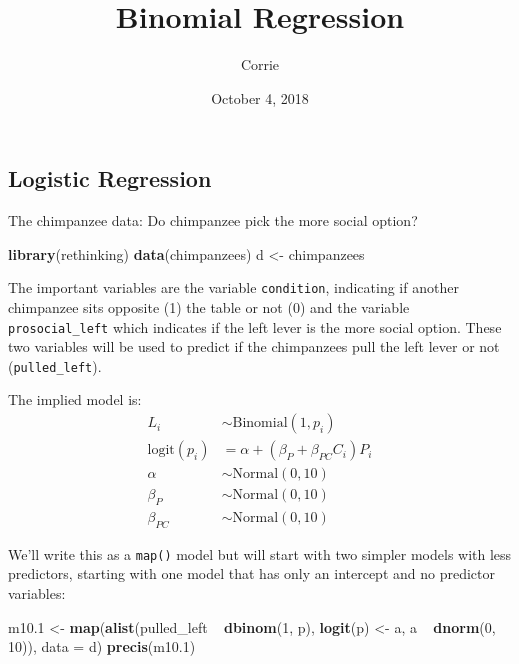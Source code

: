 \documentclass[]{tufte-handout}
\title{Binomial Regression}
\author{Corrie}
\date{October 4, 2018}
\newenvironment{Shaded}{}{}
\newcommand{\KeywordTok}[1]{\textcolor[rgb]{0.00,0.44,0.13}{\textbf{#1}}}
\newcommand{\DataTypeTok}[1]{\textcolor[rgb]{0.56,0.13,0.00}{#1}}
\newcommand{\DecValTok}[1]{\textcolor[rgb]{0.25,0.63,0.44}{#1}}
\newcommand{\FloatTok}[1]{\textcolor[rgb]{0.25,0.63,0.44}{#1}}
\newcommand{\StringTok}[1]{\textcolor[rgb]{0.25,0.44,0.63}{#1}}
\newcommand{\OperatorTok}[1]{\textcolor[rgb]{0.40,0.40,0.40}{#1}}
\newcommand{\NormalTok}[1]{#1}
\begin{document}
\maketitle




\subsection{Logistic Regression}\label{logistic-regression}

The chimpanzee data: Do chimpanzee pick the more social option?

\begin{Shaded}
\begin{Highlighting}[]
\KeywordTok{library}\NormalTok{(rethinking)}
\KeywordTok{data}\NormalTok{(chimpanzees)}
\NormalTok{d <-}\StringTok{ }\NormalTok{chimpanzees}
\end{Highlighting}
\end{Shaded}

The important variables are the variable \texttt{condition}, indicating
if another chimpanzee sits opposite (1) the table or not (0) and the
variable \texttt{prosocial\_left} which indicates if the left lever is
the more social option. These two variables will be used to predict if
the chimpanzees pull the left lever or not (\texttt{pulled\_left}).

The implied model is: \[\begin{align*}
L_i &\sim \text{Binomial}(1, p_i)\\
\text{logit}(p_i) &= \alpha + (\beta_P + \beta_{PC}C_i)P_i \\
\alpha &\sim \text{Normal}(0, 10) \\
\beta_P &\sim \text{Normal}(0, 10) \\
\beta_{PC} &\sim \text{Normal}(0, 10) 
\end{align*}\]

We'll write this as a \texttt{map()} model but will start with two
simpler models with less predictors, starting with one model that has
only an intercept and no predictor variables:

\begin{Shaded}
\begin{Highlighting}[]
\NormalTok{m10}\FloatTok{.1}\NormalTok{ <-}\StringTok{ }\KeywordTok{map}\NormalTok{(}\KeywordTok{alist}\NormalTok{(pulled_left }\OperatorTok{~}\StringTok{ }\KeywordTok{dbinom}\NormalTok{(}\DecValTok{1}\NormalTok{, p), }
    \KeywordTok{logit}\NormalTok{(p) <-}\StringTok{ }\NormalTok{a, a }\OperatorTok{~}\StringTok{ }\KeywordTok{dnorm}\NormalTok{(}\DecValTok{0}\NormalTok{, }\DecValTok{10}\NormalTok{)), }\DataTypeTok{data =}\NormalTok{ d)}
\KeywordTok{precis}\NormalTok{(m10}\FloatTok{.1}\NormalTok{)}
\end{Highlighting}
\end{Shaded}
\end{document}
